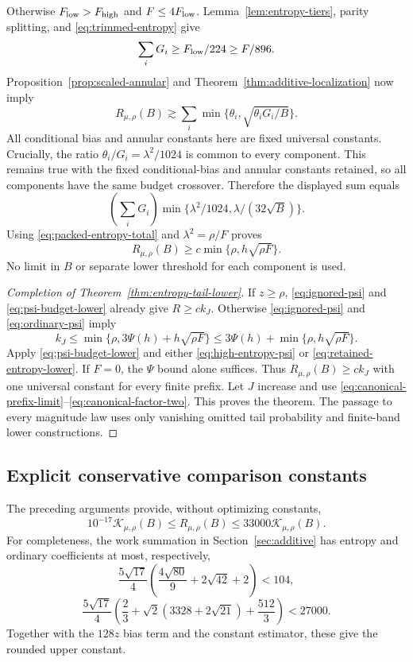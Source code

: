 Otherwise $F_{\rm low}>F_{\rm high}$ and $F\le4F_{\rm low}$.
Lemma~\ref{lem:entropy-tiers}, parity splitting, and
\eqref{eq:trimmed-entropy} give
\begin{equation}\label{eq:packed-entropy-total}
 \sum_iG_i\ge F_{\rm low}/224\ge F/896.
\end{equation}
Proposition~\ref{prop:scaled-annular} and
Theorem~\ref{thm:additive-localization} now imply
\[
 R_{\mu,\rho}(B)\gtrsim
       \sum_i\min\{\theta_i,\sqrt{\theta_iG_i/B}\}.
\]
All conditional bias and annular constants here are fixed universal
constants. Crucially, the ratio $\theta_i/G_i=\lambda^2/1024$ is common
to every component. This remains true with the fixed conditional-bias
and annular constants retained, so all components have the same budget
crossover. Therefore the displayed sum equals
\[
 \left(\sum_iG_i\right)
       \min\{\lambda^2/1024,\lambda/(32\sqrt B)\}.
\]
Using \eqref{eq:packed-entropy-total} and
$\lambda^2=\rho/F$ proves
\begin{equation}\label{eq:retained-entropy-lower}
 R_{\mu,\rho}(B)\ge c
                  \min\{\rho,h\sqrt{\rho F}\}.
\end{equation}
No limit in $B$ or separate lower threshold for each component is used.

\begin{proof}[Completion of Theorem~\ref{thm:entropy-tail-lower}]
If $z\ge\rho$, \eqref{eq:ignored-psi} and
\eqref{eq:psi-budget-lower} already give $R\ge c k_J$.
Otherwise \eqref{eq:ignored-psi} and \eqref{eq:ordinary-psi} imply
\[
 k_J\le\min\{\rho,3\Psi(h)+h\sqrt{\rho F}\}
       \le3\Psi(h)+\min\{\rho,h\sqrt{\rho F}\}.
\]
Apply \eqref{eq:psi-budget-lower} and either
\eqref{eq:high-entropy-psi} or \eqref{eq:retained-entropy-lower}.
If $F=0$, the $\Psi$ bound alone suffices.
Thus $R_{\mu,\rho}(B)\ge c k_J$ with one universal constant for every
finite prefix. Let $J$ increase and use
\eqref{eq:canonical-prefix-limit}--\eqref{eq:canonical-factor-two}.
This proves the theorem. The passage to every magnitude law uses only
vanishing omitted tail probability and finite-band lower constructions.
\end{proof}


\subsection{Explicit conservative comparison constants}

The preceding arguments provide, without optimizing constants,
\begin{equation}\label{eq:explicit-main-constants}
 10^{-17}\mathcal K_{\mu,\rho}(B)
 \le R_{\mu,\rho}(B)\le33000\mathcal K_{\mu,\rho}(B).
\end{equation}
For completeness, the work summation in Section~\ref{sec:additive} has
entropy and ordinary coefficients at most, respectively,
\[
 \frac{5\sqrt{17}}4
 \left(\frac{4\sqrt{80}}9+2\sqrt{42}+2\right)<104,
\]
\[
 \frac{5\sqrt{17}}4
 \left(\frac23+\sqrt2(3328+2\sqrt{21})+\frac{512}3\right)<27000.
\]
Together with the $128z$ bias term and the constant estimator, these
give the rounded upper constant.

